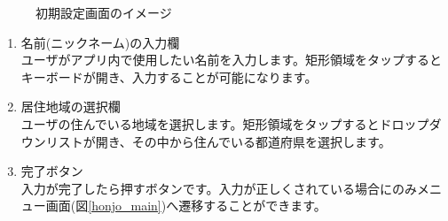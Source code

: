 \documentclass[a4j]{jarticle}
\begin{document}
\begin{figure}[H]
    \begin{center}
    \caption {初期設定画面のイメージ}
    \label{honjo_setup}
    \end{center}
\end{figure}

\begin{enumerate}
  \renewcommand{\labelenumi}{\textcircled{\scriptsize \theenumi}}
  \item 名前(ニックネーム)の入力欄\\
        ユーザがアプリ内で使用したい名前を入力します。矩形領域をタップするとキーボードが開き、入力することが可能になります。
  \item 居住地域の選択欄\\
        ユーザの住んでいる地域を選択します。矩形領域をタップするとドロップダウンリストが開き、その中から住んでいる都道府県を選択します。
  \item 完了ボタン\\
        入力が完了したら押すボタンです。入力が正しくされている場合にのみメニュー画面(図\ref{honjo_main})へ遷移することができます。
\end{enumerate}
\end{document}
